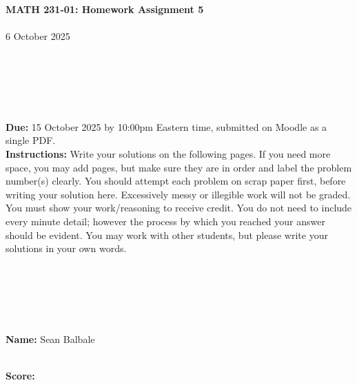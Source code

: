 \documentclass[reqno, 12pt]{amsart}
\begin{document}
\begin{center}
  {\bf MATH 231-01: Homework Assignment 5}\\~\\
  6 October 2025\\~\\~\\~\\~\\~\\
\end{center}

{\bf Due:} 15 October 2025 by 10:00pm Eastern time, submitted on Moodle as a single PDF.~\\


{\bf Instructions:} Write your solutions on the following pages. If you need more space, you may add pages, but make sure they are in order and label the problem number(s) clearly. You should attempt each problem on scrap paper first, before writing your solution here. Excessively messy or illegible work will not be graded. You must show your work/reasoning to receive credit. You do not need to include every minute detail; however the process by which you reached your answer should be evident. You may work with other students, but please write your solutions in your own words.

~\\~\\~\\~\\~\\
{\bf Name:} Sean Balbale

~\\
{\bf Score:}
\end{document}
